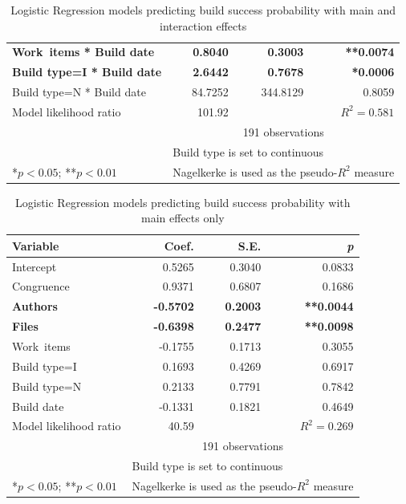 \begin{table}[t]
\begin{center}
\begin{tabular}{l@{\hspace{15pt}}rrr}
\textbf{Work~items * Build date}       &   \textbf{0.8040} &   \textbf{0.3003} & \textbf{**0.0074}  \\
\textbf{Build type=I * Build date}          &   \textbf{2.6442} &   \textbf{0.7678} & \textbf{*0.0006} \\
Build type=N * Build date          &  84.7252 & 344.8129 & 0.8059  \\
	\bottomrule
Model likelihood ratio & 101.92 &  & $R^2=0.581$  \\
& \multicolumn{3}{c}{191 observations}  \\
\multicolumn{1}{l}{ } & \multicolumn{3}{l}{\scriptsize{Build type is set to continuous}} \\
\multicolumn{1}{l}{\scriptsize{*$p < 0.05$; **$p < 0.01$}} & \multicolumn{3}{l}{\scriptsize{Nagelkerke is used as the pseudo-$R^2$ measure}}
\end{tabular}
\end{center}
\caption{Logistic Regression models predicting build success probability with main and interaction effects}
\label{tab:logr}
\end{table}


\begin{table}[t]
\begin{center}
\begin{tabular}{l@{\hspace{15pt}}rr r}
\toprule
Variable & Coef. & S.E. & \emph{p} \\
	\midrule                                                                
	Intercept                &  0.5265 & 0.3040 & 0.0833 \\
	Congruence               &  0.9371 & 0.6807 & 0.1686 \\
	\textbf{Authors}         & \textbf{-0.5702} & \textbf{0.2003} & \textbf{**0.0044}  \\
	\textbf{Files}           & \textbf{-0.6398} & \textbf{0.2477} & \textbf{**0.0098} \\
	Work~items                & -0.1755 & 0.1713 & 0.3055  \\
	Build type=I                   &  0.1693 & 0.4269 & 0.6917  \\
	Build type=N                   &  0.2133 & 0.7791 & 0.7842  \\
	Build date               & -0.1331 & 0.1821 & 0.4649  \\
	\bottomrule
Model likelihood ratio & 40.59 &  & $R^2=0.269$  \\
& \multicolumn{3}{c}{191 observations}  \\
\multicolumn{1}{l}{ } & \multicolumn{3}{l}{\scriptsize{Build type is set to continuous}} \\
\multicolumn{1}{l}{\scriptsize{*$p < 0.05$; **$p < 0.01$}} & \multicolumn{3}{l}{\scriptsize{Nagelkerke is used as the pseudo-$R^2$ measure}}
\end{tabular}
\end{center}
\caption{Logistic Regression models predicting build success probability with main effects only}
\label{tab:logr_maineffects}
\end{table}

